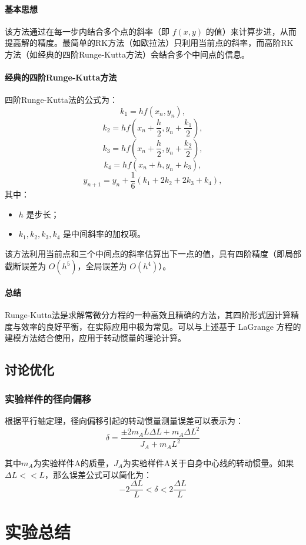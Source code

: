 \documentclass[12pt,hyperref,a4paper,UTF8]{ctexart}
\begin{document}
\paragraph{基本思想}
该方法通过在每一步内结合多个点的斜率（即 \( f(x, y) \) 的值）来计算步进，从而提高解的精度。最简单的RK方法（如欧拉法）只利用当前点的斜率，而高阶RK方法（如经典的四阶Runge-Kutta方法）会结合多个中间点的信息。

\paragraph{经典的四阶Runge-Kutta方法}
四阶Runge-Kutta法的公式为：
\[
k_1 = h f(x_n, y_n),
\]
\[
k_2 = h f\left(x_n + \frac{h}{2}, y_n + \frac{k_1}{2}\right),
\]
\[
k_3 = h f\left(x_n + \frac{h}{2}, y_n + \frac{k_2}{2}\right),
\]
\[
k_4 = h f(x_n + h, y_n + k_3),
\]
\[
y_{n+1} = y_n + \frac{1}{6}(k_1 + 2k_2 + 2k_3 + k_4),
\]
其中：
\begin{itemize}
    \item \( h \) 是步长；
    \item \( k_1, k_2, k_3, k_4 \) 是中间斜率的加权项。
\end{itemize}

该方法利用当前点和三个中间点的斜率估算出下一点的值，具有四阶精度（即局部截断误差为 \( O(h^5) \)，全局误差为 \( O(h^4) \)）。

\paragraph{总结}
Runge-Kutta法是求解常微分方程的一种高效且精确的方法，其四阶形式因计算精度与效率的良好平衡，在实际应用中极为常见。可以与上述基于 LaGrange 方程的建模方法结合使用，应用于转动惯量的理论计算。

\subsection{讨论优化}
\subsubsection{实验样件的径向偏移}
根据平行轴定理，径向偏移引起的转动惯量测量误差可以表示为：
$$ \delta=\frac{\pm 2m_AL\Delta L+m_A\Delta L^2}{J_A+m_AL^2} $$

其中$m_A$为实验样件A的质量，$J_A$为实验样件A关于自身中心线的转动惯量。如果$\Delta L<<L$，那么误差公式可以简化为：
$$ -2\frac{\Delta L}{L}<\delta<2\frac{\Delta L}{L} $$
\section{实验总结}
\end{document}
